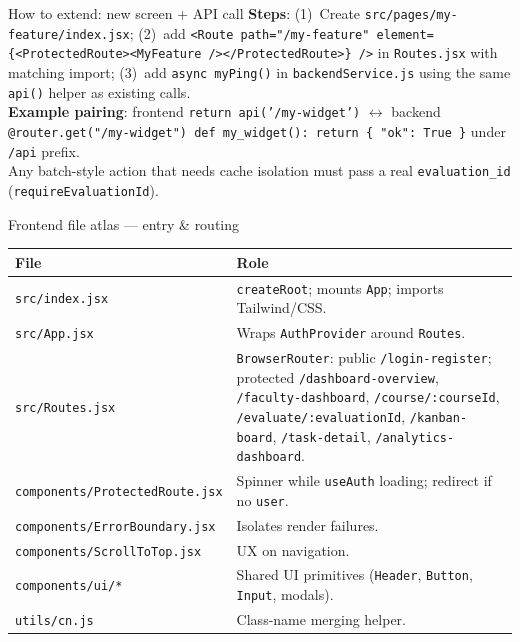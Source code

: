 \documentclass[aspectratio=169]{beamer}
\begin{document}
\begin{frame}{How to extend: new screen + API call}
  \small
  \textbf{Steps}: (1)~Create \texttt{src/pages/my-feature/index.jsx}; (2)~add \texttt{<Route path="/my-feature" element=\{<ProtectedRoute><MyFeature /></ProtectedRoute>\} />} in \texttt{Routes.jsx} with matching import; (3)~add \texttt{async myPing()} in \texttt{backendService.js} using the same \texttt{api()} helper as existing calls.\\
  \textbf{Example pairing}: frontend \texttt{return api('/my-widget')} $\leftrightarrow$ backend \texttt{@router.get("/my-widget") def my\_widget(): return \{ "ok": True \}} under \texttt{/api} prefix.\\
  Any batch-style action that needs cache isolation must pass a real \texttt{evaluation\_id} (\texttt{requireEvaluationId}).
\end{frame}

\begin{frame}{Frontend file atlas --- entry \& routing}
  \tiny
  \begin{tabular}{@{}p{5.0cm}p{8.8cm}@{}}
    \toprule
    File & Role \\
    \midrule
    \texttt{src/index.jsx} & \texttt{createRoot}; mounts \texttt{App}; imports Tailwind/CSS. \\
    \texttt{src/App.jsx} & Wraps \texttt{AuthProvider} around \texttt{Routes}. \\
    \texttt{src/Routes.jsx} & \texttt{BrowserRouter}: public \texttt{/login-register}; protected \texttt{/dashboard-overview}, \texttt{/faculty-dashboard}, \texttt{/course/:courseId}, \texttt{/evaluate/:evaluationId}, \texttt{/kanban-board}, \texttt{/task-detail}, \texttt{/analytics-dashboard}. \\
    \texttt{components/ProtectedRoute.jsx} & Spinner while \texttt{useAuth} loading; redirect if no \texttt{user}. \\
    \texttt{components/ErrorBoundary.jsx} & Isolates render failures. \\
    \texttt{components/ScrollToTop.jsx} & UX on navigation. \\
    \texttt{components/ui/*} & Shared UI primitives (\texttt{Header}, \texttt{Button}, \texttt{Input}, modals). \\
    \texttt{utils/cn.js} & Class-name merging helper. \\
    \bottomrule
  \end{tabular}
\end{frame}
\end{document}
